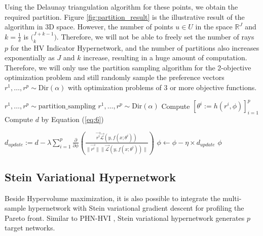 \documentclass[letterpaper]{article} %
\newcommand{\ourmodel}{PHN-HVI }
\begin{document}
Using the Delaunay triangulation algorithm \cite{Edelsbrunner1985VoronoiDA} for these points, we obtain the required partition. Figure \ref{fig:partition_result} is the illustrative result of the algorithm in 3D space. However, the number of points $u \in U$ in the space $\mathbb{R}^J$ and $k = \frac{1}{\delta}$ is $\Big (^{J+k-1}_k \Big)$. Therefore, we will not be able to freely set the number of rays $p$ for the HV Indicator Hypernetwork, and the number of partitions also increases exponentially as $J$ and $k$ increase, resulting in a huge amount of computation. Therefore, we will only use the partition sampling algorithm for the 2-objective optimization problem and still randomly sample the preference vectors $r^1, \dots, r^p \sim \text{Dir}(\alpha)$ with optimization problems of 3 or more objective functions.

\begin{algorithm}
\caption{\ourmodel optimization algorithm}
\begin{algorithmic}[1]
\STATE $r^1, \dots, r^p \sim \text{partition\_sampling}$
\ELSE
\STATE $r^1, \dots, r^p \sim \text{Dir}(\alpha)$
\ENDIF
\STATE Compute $\left[\theta^{i} := h(r^i, \phi)\right]_{i=1}^p$ %
\STATE Compute $d$ by Equation (\ref{eq:6})

\STATE $d_{update} := d - \lambda\sum_{i=1}^p \frac{\partial}{\partial \phi}\left( \frac{\vec{r^i}\vec{\mathcal{L}}(y, f\left(x; \theta^{i} \right))}{\|\vec{r^i}\|\|\vec{\mathcal{L}}(y, f\left(x; \theta^{i} \right))\|}\right) $
\STATE $\phi \xleftarrow{} \phi - \eta \times d_{update} $
\ENDWHILE
\RETURN $\phi$
\end{algorithmic}
\label{alg:1}
\end{algorithm}

\subsection{Stein Variational Hypernetwork}
Beside Hypervolume maximization, it is also possible to integrate the multi-sample hypernetwork with Stein variational gradient descent \cite{moosvgd} for profiling the Pareto front. Similar to \ourmodel, Stein variational hypernetwork generates $p$ target networks.
\end{document}
